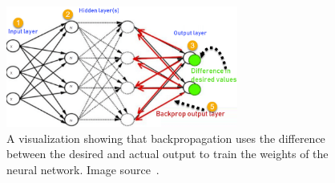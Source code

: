 \documentclass{article}
\begin{document}
\begin{figure}
    \centering
    \includegraphics[width=3in]{figures/backpropagation.png}
    \caption{A visualization showing that backpropagation uses the difference between the desired and actual output to train the weights of the neural network. Image source~\protect\cite{backprop}.}\label{figure:backpropagation}
\end{figure}



\end{document}
